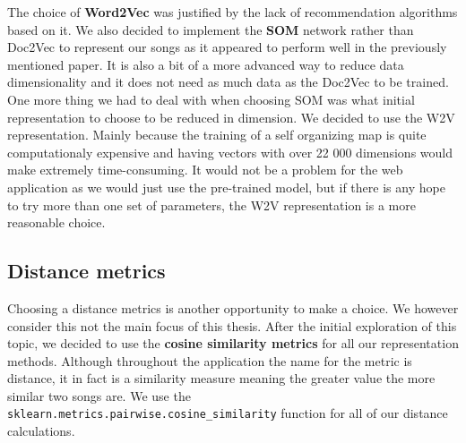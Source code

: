 The choice of \textbf{Word2Vec} was justified by the lack of recommendation algorithms based on it. We also decided to implement the \textbf{SOM} network rather than Doc2Vec to represent our songs as it appeared to perform well in the previously mentioned paper. It is also a bit of a more advanced way to reduce data dimensionality and it does not need as much data as the Doc2Vec to be trained. One more thing we had to deal with when choosing SOM was what initial representation to choose to be reduced in dimension. We decided to use the W2V representation. Mainly because the training of a self organizing map is quite computationaly expensive and having vectors with over 22 000 dimensions would make extremely time-consuming. It would not be a problem for the web application as we would just use the pre-trained model, but if there is any hope to try more than one set of parameters, the W2V representation is a more reasonable choice.

\subsection{Distance metrics}
Choosing a distance metrics is another opportunity to make a choice. We however consider this not the main focus of this thesis. After the initial exploration of this topic, we decided to use the \textbf{cosine similarity metrics} for all our representation methods. Although throughout the application the name for the metric is distance, it in fact is a similarity measure meaning the greater value the more similar two songs are. We use the \texttt{sklearn.metrics.pairwise.cosine\_similarity} function for all of our distance calculations.